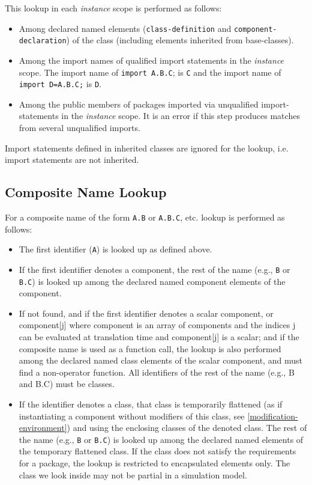 This lookup in each \emph{instance} scope is performed as follows:
\begin{itemize}
\item
  Among declared named elements (\lstinline!class-definition! and
  \lstinline!component-declaration!) of the class (including elements inherited from
  base-classes).
\item
  Among the import names of qualified import statements in the
  \emph{instance} scope. The import name of \lstinline!import A.B.C!; is \lstinline!C! and the
  import name of \lstinline!import D=A.B.C;! is \lstinline!D!.
\item
  Among the public members of packages imported via unqualified
  import-statements in the \emph{instance} scope. It is an error if
  this step produces matches from several unqualified imports.
\end{itemize}

Import statements defined in inherited classes are ignored for the lookup, i.e. import statements are not inherited.

\subsection{Composite Name Lookup}

For a composite name of the form \lstinline!A.B! or \lstinline!A.B.C!, etc. lookup is performed
as follows:
\begin{itemize}
\item
  The first identifier (\lstinline!A!) is looked up as defined above.
\item
  If the first identifier denotes a component, the rest of the name
  (e.g., \lstinline!B! or \lstinline!B.C!) is looked up among the declared named component
  elements of the component.
\item
  If not found, and if the first identifier denotes a scalar component,
  or component[j] where component is an array of components and the
  indices j can be evaluated at translation time and component[j] is
  a scalar; and if the composite name is used as a function call, the
  lookup is also performed among the declared named class elements of
  the scalar component, and must find a non-operator function. All
  identifiers of the rest of the name (e.g., B and B.C) must be
  classes.
\item
  If the identifier denotes a class, that class is temporarily flattened
  (as if instantiating a component without modifiers of this class, see
  \autoref{modification-environment}) and using the enclosing classes of the denoted class.
  The rest of the name (e.g., \lstinline!B! or \lstinline!B.C!) is looked up among the
  declared named elements of the temporary flattened class. If the class
  does not satisfy the requirements for a package, the lookup is
  restricted to encapsulated elements only. The class we look inside may
  not be partial in a simulation model.
\end{itemize}

